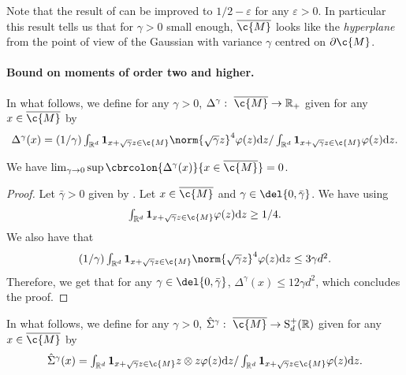 Note that the result of  can be improved to $1/2-\varepsilon$ for any $\varepsilon > 0$.
In particular this result tells us that for $\gamma > 0$ small enough, $\cl{\c{M}}$ looks like the \emph{hyperplane} from the point of view of the Gaussian with variance $\gamma$ centred on $\partial \c{M}$.

\paragraph{Bound on moments of order two and higher.}

In what follows, we define for any $\gamma >0$, $\Delta^\gamma: \ \cl{\c{M}} \to \R_+$ given for any $x \in \cl{\c{M}}$ by \begin{equation} \label{eq:intermediate_Delta} \textstyle{ \Delta^\gamma(x) = (1/\gamma) \int_{\R^d} \bm{1}_{x + \sqrt{\gamma} z \in \c{M}} \norm{\sqrt{\gamma} z}^4 \varphi(z) \mathrm{d} z / \int_{\R^d} \bm{1}_{x + \sqrt{\gamma} z \in \c{M}} \varphi(z) \mathrm{d} z.
	}
\end{equation}

\begin{proposition}
	\label{prop:condition_a}
	We have $\lim_{\gamma \to 0} \sup \cbrcolon{\Delta^\gamma(x)}{x \in \cl{\c{M}}} = 0$.
\end{proposition}

\begin{proof}
	Let $\bar{\gamma} >0$ given by .
	Let $x \in \cl{\c{M}}$ and $\gamma \in \del{0, \bar{\gamma}}$.
	We have using  \begin{equation} \textstyle{\int_{\R^d} \bm{1}_{x + \sqrt{\gamma} z \in \c{M}} \varphi(z) \mathrm{d} z \geq 1/4 .
		}
	\end{equation}
	We also have that \begin{equation} \textstyle{ (1/\gamma) \int_{\R^d} \bm{1}_{x + \sqrt{\gamma} z \in \c{M}} \norm{\sqrt{\gamma} z}^4 \varphi(z) \mathrm{d} z \leq 3 \gamma d^2 .
		}
	\end{equation}
	Therefore, we get that for any $\gamma \in \del{0, \bar{\gamma}}$, $\Delta^\gamma(x) \leq 12 \gamma d^2$, which concludes the proof.
\end{proof}

In what follows, we define for any $\gamma >0$, $\hat{\Sigma}^\gamma: \ \cl{\c{M}} \to \mathrm{S}_d^+(\R)$ given for any $x \in \cl{\c{M}}$ by \begin{equation} \label{eq:intermediate_diffusion} \textstyle{ \hat{\Sigma}^\gamma(x) = \int_{\R^d} \bm{1}_{x + \sqrt{\gamma} z \in \c{M}} z \otimes z \varphi(z) \mathrm{d} z / \int_{\R^d} \bm{1}_{x + \sqrt{\gamma} z \in \c{M}} \varphi(z) \mathrm{d} z.
	}
\end{equation}

